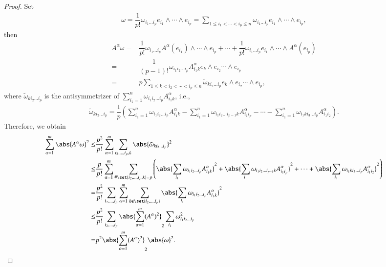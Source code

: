 \documentclass[12pt]{amsart}
\theoremstyle{plain}
\theoremstyle{remark}
\theoremstyle{definition}
\numberwithin{equation}{section}
\begin{document}
\begin{proof}
Set
\begin{align*}
\omega=\dfrac{1}{p!}\omega_{i_1\dotsc i_p}e_{i_1}\wedge\dotsm\wedge e_{i_p}=\sum_{1\leq i_1<\dotsm<i_p\leq n}\omega_{i_1\dotsc i_p}e_{i_1}\wedge\dotsm\wedge e_{i_p},
\end{align*}
then
\begin{align*}
A^{\alpha}\omega=&\dfrac{1}{p!}\omega_{i_1\dotsc i_p}A^{\alpha}(e_{i_1})\wedge\dotsm\wedge e_{i_p}+\dotsm+\dfrac{1}{p!}\omega_{i_1\dotsc i_p}e_{i_1}\wedge\dotsm\wedge A^{\alpha}(e_{i_p})\\
=&\dfrac{1}{(p-1)!}\omega_{i_1i_2\dotsc i_p}A^{\alpha}_{i_1k}e_k\wedge e_{i_2}\dotsm\wedge e_{i_p}\\
=&p\sum_{1\leq k<i_2<\dotsm<i_p\leq n}\tilde\omega_{k i_2\dotsc i_p}e_k\wedge e_{i_2}\dotsm\wedge e_{i_p},
\end{align*}
where $\tilde\omega_{k i_2\dotsc i_p}$ is the antisymmetrizer of $\sum_{i_1=1}^n\omega_{i_1i_2\dotsc i_p}A^{\alpha}_{i_1k}$, i.e.,
\begin{align*}
\tilde\omega_{k i_2\dotsc i_p}=\dfrac1p\left(\sum_{i_1=1}^n\omega_{i_1i_2\dotsc i_p}A^{\alpha}_{i_1k}-\sum_{i_1=1}^n\omega_{i_1i_2\dotsc i_{p-1}k}A^{\alpha}_{i_1i_p}-\dotsm-\sum_{i_1=1}^n\omega_{i_1ki_3\dotsc i_p}A^{\alpha}_{i_1i_2}\right).
\end{align*}
Therefore, we obtain
\begin{align*}
\sum_{\alpha=1}^m\abs{A^{\alpha}\omega}^2\leq&\dfrac{ p^2}{p!}\sum_{\alpha=1}^m\sum_{i_2,\dotsc,i_p,k}\abs{\tilde\omega_{ki_2\dotsc i_p}}^2\\
\leq&\dfrac{ p}{p!}\sum_{\alpha=1}^m\sum_{\#\set{i_2,\dotsc,i_p,k}=p}\left(\abs{\sum_{i_1}\omega_{i_1i_2\dotsc i_p}A^{\alpha}_{i_1k}}^2+\abs{\sum_{i_1}\omega_{i_1i_2\dotsc i_{p-1}k}A^{\alpha}_{i_1i_p}}^2+\dotsm+\abs{\sum_{i_1}\omega_{i_1ki_3\dotsc i_p}A^{\alpha}_{i_1i_2}}^2\right)\\
=&\dfrac{ p^2}{p!}\sum_{i_2,\dotsc,i_p}\sum_{\alpha=1}^m\sum_{k\notin\set{i_2,\dotsc,i_p}}\abs{\sum_{i_1}\omega_{i_1i_2\dotsc i_p}A^{\alpha}_{i_1k}}^2\\
\leq&\dfrac{ p^2}{p!}\sum_{i_2,\dotsc,i_p}\abs{\sum_{\alpha=1}^m(A^{\alpha})^2}_2\sum_{i_1}\omega_{i_1i_2\dotsc i_p}^2\\
=&p^2\abs{\sum_{\alpha=1}^m(A^{\alpha})^2}_2\abs{\omega}^2.
\end{align*}
\end{proof}
\end{document}
